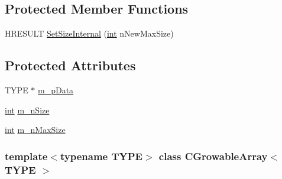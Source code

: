 \subsection*{Protected Member Functions}
\begin{DoxyCompactItemize}
\item 
HRESULT \hyperlink{class_c_growable_array_a038c8e7e9d43bdbc27c4260ffbf00f10}{SetSizeInternal} (\hyperlink{_d_x_u_tgui_8cpp_a2d77ed03302b6978834ee3b6f57837fb}{int} nNewMaxSize)
\end{DoxyCompactItemize}
\subsection*{Protected Attributes}
\begin{DoxyCompactItemize}
\item 
TYPE $\ast$ \hyperlink{class_c_growable_array_aae806f24201f88709a0c241f0f832cf4}{m\_\-pData}
\item 
\hyperlink{_d_x_u_tgui_8cpp_a2d77ed03302b6978834ee3b6f57837fb}{int} \hyperlink{class_c_growable_array_a6ae5d526df0f65163cae53792a6c9616}{m\_\-nSize}
\item 
\hyperlink{_d_x_u_tgui_8cpp_a2d77ed03302b6978834ee3b6f57837fb}{int} \hyperlink{class_c_growable_array_a8fe1ea6b03bbb8a0dca92c4fb7046c5d}{m\_\-nMaxSize}
\end{DoxyCompactItemize}
\subsubsection*{template$<$typename TYPE$>$ class CGrowableArray$<$ TYPE $>$}



